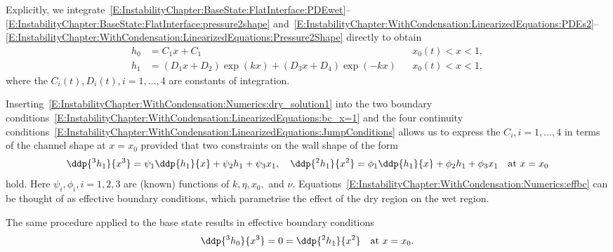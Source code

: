 \begin{subappendices}
Explicitly, we integrate~\eqref{E:InstabilityChapter:BaseState:FlatInterface:PDEwet}--\eqref{E:InstabilityChapter:BaseState:FlatInterface:pressure2shape}
and~\eqref{E:InstabilityChapter:WithCondensation:LinearizedEquations:PDEs2}--\eqref{E:InstabilityChapter:WithCondensation:LinearizedEquations:Pressure2Shape} directly to obtain
\begin{align}
h_0 &= C_1 x + C_1 & & x_0(t) < x < 1,\label{E:InstabilityChapter:WithCondensation:Numerics:dry_solution0}\\
h_1 &= (D_1 x + D_2)\exp(kx) + (D_3 x + D_4)\exp(-kx) & & x_0(t) < x < 1,\label{E:InstabilityChapter:WithCondensation:Numerics:dry_solution1}
\end{align}
where the $C_i(t), D_i(t), i = 1,\dots, 4$ are constants of integration.

Inserting~\eqref{E:InstabilityChapter:WithCondensation:Numerics:dry_solution1} into the two boundary conditions~\eqref{E:InstabilityChapter:WithCondensation:LinearizedEquations:bc_x=1} and the four continuity  conditions~\eqref{E:InstabilityChapter:WithCondensation:LinearizedEquations:JumpConditions} allows us to express the $C_i, i = 1,\dots,4$ in terms of the channel shape at $x = x_0$ provided that two constraints on the wall shape of the form
\begin{equation}\label{E:InstabilityChapter:WithCondensation:Numerics:effbc}
\ddp{^3 h_1}{x^3} = \psi_1 \ddp{h_1}{x} + \psi_2 h_1 + \psi_3 x_1, \quad \ddp{^2 h_1}{x^2} = \phi_1 \ddp{h_1}{x} + \phi_2 h_1 + \phi_3 x_1 \quad \text{at}~x  = x_0
\end{equation}
hold. Here $\psi_i, \phi_i, i = 1,2,3$ are (known) functions of $k, \eta, x_0,$ and $\nu$. Equations~\eqref{E:InstabilityChapter:WithCondensation:Numerics:effbc} can be thought of as effective boundary conditions, which parametrise the effect of the dry region on the wet region.

The same procedure applied to the base state results in effective boundary conditions
\begin{equation}\label{E:InstabilityChapter:WithCondensation:Numerics:effbc_base_state}
\ddp{^3 h_0}{x^3} = 0= \ddp{^2 h_1}{x^2} \quad\text{at}~x  = x_0.
\end{equation}


\end{subappendices}
